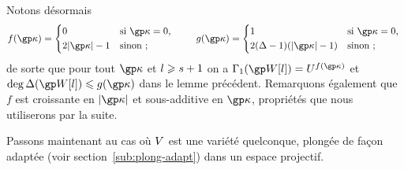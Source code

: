 
Notons désormais
\begin{equation} \label{e:def-f-g}
  f(\derp) =
  \begin{cases*}
    0                               & si \( \derp = 0 \), \\
    2\lgr\derp - 1                  & sinon ;
  \end{cases*}
  \qquad
  g(\derp) =
  \begin{cases*}
    1                               & si \( \derp = 0 \), \\
    2 (\anydeg - 1) (\lgr\derp - 1) & sinon ;
  \end{cases*}
\end{equation}
de sorte que pour tout \( \derp \) et \( l \geqslant s + 1 \) on a
\( \pmden_1(\anyvp[\indi]) = \pden^{f(\derp)} \) et
\( \deg \pmnum(\anyvp[\indi]) \le g(\derp) \) dans le lemme précédent.
Remarquons également que \( f \) est croissante en \( \lgr\derp \) et
sous-additive en \( \derp \), propriétés que nous utiliserons par la suite.

Passons maintenant au cas où \( V \) est une variété quelconque, plongée
de façon adaptée (voir section~\ref{sub:plong-adapt}) dans un espace
projectif.

